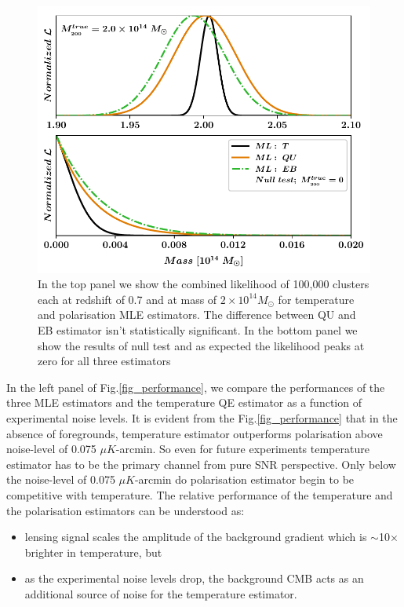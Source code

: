  \begin{figure}[t]
\includegraphics[width=\linewidth, keepaspectratio]{figs/fig0-eps-converted-to.pdf}
 \caption{In the top panel we show the combined likelihood of 100,000 clusters each at redshift of 0.7 and at mass of $2\times 10^{14} M_{\odot}$ for temperature and polarisation MLE estimators. The difference between QU and EB estimator isn't statistically significant. In the bottom panel we show the results of null test and as expected the likelihood peaks at zero for all three estimators}
\label{lkhd_curve}
 \end{figure}
 
 In the left panel of Fig.\ref{fig_performance}, we compare the performances of the three MLE estimators and the temperature QE estimator as a function of experimental noise levels. 
 It is evident from the Fig.\ref{fig_performance} that in the absence of foregrounds, temperature estimator outperforms polarisation above noise-level of 0.075 $\mu K$-arcmin.
 So even for future experiments temperature estimator has to be the primary channel from pure SNR perspective.
 Only below the noise-level of  0.075 $\mu K$-arcmin do polarisation estimator begin to be competitive with temperature.
 The relative performance of the temperature and the polarisation estimators can be understood as:
 \begin{itemize}
 \item lensing signal scales the amplitude of the background gradient which is $\sim$10$\times$ brighter in temperature, but
 \item as the experimental noise levels drop, the background CMB acts as an additional source of noise for the temperature estimator.
 \end{itemize}
 
